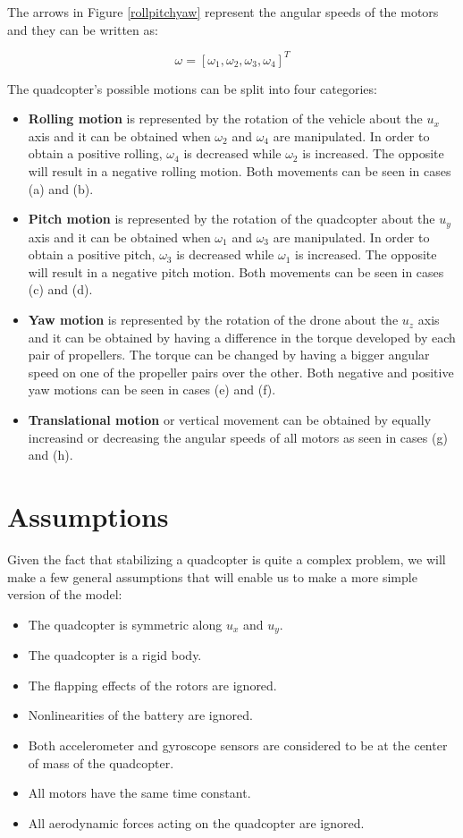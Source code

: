 The arrows in Figure \ref{rollpitchyaw} represent the angular speeds of the motors and they can be written as:

\begin{equation}
	\omega=[\omega_{1}, \omega_{2}, \omega_{3}, \omega_{4}] ^{T}
\end{equation} 

The quadcopter's possible motions can be split into four categories:

\begin{itemize}
  \item \textbf{Rolling motion} is represented by the rotation of the vehicle about the $u_{x}$ axis and it can be obtained when $\omega_{2}$ and $\omega_{4}$ are manipulated. In order to obtain a positive rolling, $\omega_{4}$ is decreased while $\omega_{2}$ is increased. The opposite will result in a negative rolling motion. Both movements can be seen in cases (a) and (b).
  \item \textbf{Pitch motion} is represented by the rotation of the quadcopter about the $u_{y}$ axis and it can be obtained when $\omega_{1}$ and $\omega_{3}$ are manipulated. In order to obtain a positive pitch, $\omega_{3}$ is decreased while $\omega_{1}$ is increased. The opposite will result in a negative pitch motion. Both movements can be seen in cases (c) and (d).
  \item \textbf{Yaw motion} is represented by the rotation of the drone about the $u_{z}$ axis and it can be obtained by having a difference in the torque developed by each pair of propellers. The torque can be changed by having a bigger angular speed on one of the propeller pairs over the other. Both negative and positive yaw motions can be seen in cases (e) and (f).
  \item \textbf{Translational motion} or vertical movement can be obtained by equally increasind or decreasing the angular speeds of all motors as seen in cases (g) and (h)\cite{Report1}.
\end{itemize} 

\section{Assumptions}
Given the fact that stabilizing a quadcopter is quite a complex problem, we will make a few general assumptions that will enable us to make a more simple version of the model:
\begin{itemize}
  \item The quadcopter is symmetric along $u_{x}$ and $u_{y}$.
  \item The quadcopter is a rigid body.
  \item The flapping effects of the rotors are ignored.
  \item Nonlinearities of the battery are ignored.
  \item Both accelerometer and gyroscope sensors are considered to be at the center of mass of the quadcopter.
  \item All motors have the same time constant.
  \item All aerodynamic forces acting on the quadcopter are ignored.
\end{itemize} 